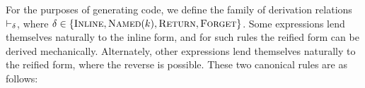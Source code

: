 \documentclass{article}
\begin{document}
    For the purposes of generating code, we define the family of derivation relations $\rwD$, where
    $\delta \in \{\textsc{Inline}, \textsc{Named$(k)$}, \textsc{Return}, \textsc{Forget}\}$. Some
    expressions lend themselves naturally to the inline form, and for such rules the reified form
    can be derived mechanically. Alternately, other expressions lend themselves naturally to the
    reified form, where the reverse is possible. These two canonical rules are as follows:
%
    \begin{mathpar}

    \end{mathpar}
\end{document}
